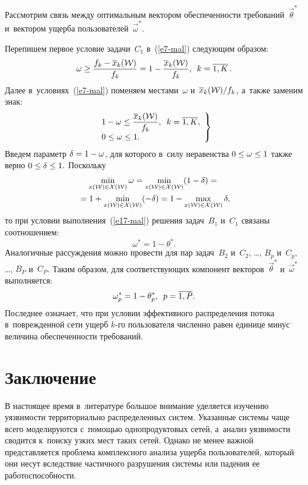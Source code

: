 \begin{multicols}{2}
Рассмотрим связь между оптимальным вектором обеспеченности 
требований~$\overrightarrow{\theta}^*$  и~вектором ущерба пользователей~$\overrightarrow{\omega}^*$.

Перепишем первое условие задачи~$C_1$ в~(\ref{e7-mal}) следующим образом:
$$
\omega \geq \displaystyle\frac{\displaystyle f_k - \overline x_k({\cal W})\mathstrut}{\displaystyle f_k\mathstrut} = 1 - \displaystyle\frac{\displaystyle \overline x_k({\cal W})\mathstrut}{\displaystyle f_k\mathstrut} , \enskip
 k = \overline{1, K}\,. 
$$
Далее в~условиях~(\ref{e7-mal}) поменяем местами~$\omega$ 
и~${\overline x_k({\cal W})}/{f_k}$, а~также заменим знак:
\begin{equation}
\left.  \begin{array}{l}
\displaystyle 1 - \omega \le \displaystyle\frac{\displaystyle \overline x_k({\cal W})\mathstrut}{\displaystyle f_k\mathstrut}, \enskip 
k = \overline{1, K}, \\[6pt]
0 \le \omega \le 1.
                    \end{array}
 \right \} 
 \label{e17-mal}
 \end{equation}
Введем параметр $\delta = 1\hm - \omega$, для которого в~силу неравенства 
$0 \hm\le \omega \hm\le 1$ также верно
$ 0\hm \le \delta \hm\le 1. $
Поскольку
\begin{multline*}
\min\limits_{x({\cal W}) \in {\cal X}({\cal W})} \omega = 
\min\limits_{x({\cal W}) \in {\cal X}({\cal W})} (1 - \delta) = {}\\
{}=1 +  \min\limits_{x({\cal W}) \in {\cal X}({\cal W})} (-  \delta) = 1 - \max\limits_{x({\cal W}) 
\in {\cal X}({\cal W})} \delta, 
\end{multline*}
то при условии выполнения~(\ref{e17-mal}) решения задач~$B_1$ и~$C_1$ 
связаны соотношением:
$$
 \omega^* = 1 - \theta^*. 
 $$
Аналогичные рассуждения можно провести для пар задач~$B_2$ и~$C_2$, \ldots, 
$B_p$ и~$C_p$, \ldots, $B_P$ и~$C_P$. Таким образом, для соответствующих компонент 
векторов~$\overrightarrow{\theta}^*$  и~$\overrightarrow{\omega}^*$ выполняется:
$$
\omega_p^* = 1 - \theta_p^*,\enskip p = \overline{1, P}.
$$
Последнее означает, что при условии эффективного распределения 
потока в~поврежденной  сети ущерб $k$-го пользователя численно равен 
единице минус величина обеспеченности требований.

\section{Заключение}

В настоящее время в~литературе большое внимание уделяется изучению уязвимости 
территори\-ально распределенных систем. Указанные системы\linebreak
 чаще всего моделируются 
с~помощью однопро\-дуктовых сетей, а~анализ уязвимости сводится к~поиску узких 
мест таких сетей. Однако не менее \mbox{важной} представляется  проблема комплексного 
анализа ущерба пользователей, который они несут вследствие частичного разрушения 
системы или падения ее работоспособности.


\end{multicols}
